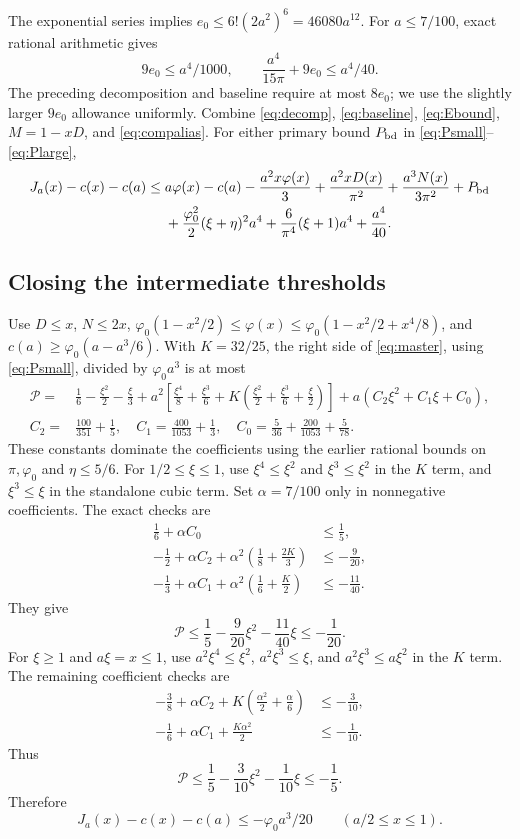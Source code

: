 \documentclass[11pt]{article}
\newcommand{\ph}{\varphi}
\newcommand{\phz}{\varphi_0}
\newcommand{\ep}{e_0}
\begin{document}
The exponential series implies
$\ep\le6!(2a^2)^6=46080a^{12}$.
For $a\le7/100$, exact rational arithmetic gives
\[
 9\ep\le a^4/1000,\qquad
 \frac{a^4}{15\pi}+9\ep\le a^4/40.
\]
The preceding decomposition and baseline require at most $8\ep$; we use
the slightly larger $9\ep$ allowance uniformly.
Combine \eqref{eq:decomp}, \eqref{eq:baseline}, \eqref{eq:Ebound},
$M=1-xD$, and \eqref{eq:compalias}. For either primary bound
$P_{\rm bd}$ in \eqref{eq:Psmall}--\eqref{eq:Plarge},
\begin{align}
 J_a(x)-c(x)-c(a)\le{}&a\ph(x)-c(a)-\frac{a^2x\ph(x)}3
   +\frac{a^2xD(x)}{\pi^2}+\frac{a^3N(x)}{3\pi^2}+P_{\rm bd}\notag\\
 &+\frac{\phz^2}2(\xi+\eta)^2a^4
   +\frac6{\pi^4}(\xi+1)a^4+\frac{a^4}{40}.\label{eq:master}
\end{align}

\subsection{Closing the intermediate thresholds}

Use $D\le x$, $N\le2x$,
$\phz(1-x^2/2)\le\ph(x)\le\phz(1-x^2/2+x^4/8)$,
and $c(a)\ge\phz(a-a^3/6)$. With $K=32/25$,
the right side of \eqref{eq:master}, using \eqref{eq:Psmall}, divided by
$\phz a^3$ is at most
\begin{align*}
 \mathcal P={}&\frac16-\frac{\xi^2}2-\frac\xi3
 +a^2\left[\frac{\xi^4}8+\frac{\xi^3}6
             +K\left(\frac{\xi^2}2+\frac{\xi^3}6+\frac\xi2\right)\right]
 +a(C_2\xi^2+C_1\xi+C_0),\\
 C_2={}&\frac{100}{351}+\frac15,\quad
 C_1=\frac{400}{1053}+\frac13,\quad
 C_0=\frac5{36}+\frac{200}{1053}+\frac5{78}.
\end{align*}
These constants dominate the coefficients using the earlier rational
bounds on $\pi,\phz$ and $\eta\le5/6$.
For $1/2\le\xi\le1$, use $\xi^4\le\xi^2$ and $\xi^3\le\xi^2$ in
the $K$ term, and $\xi^3\le\xi$ in the standalone cubic term. Set
$\alpha=7/100$ only in nonnegative coefficients. The exact checks are
\begin{align*}
 \frac16+\alpha C_0&\le\frac15,\\
 -\frac12+\alpha C_2+\alpha^2\left(\frac18+\frac{2K}3\right)
       &\le-\frac9{20},\\
 -\frac13+\alpha C_1+\alpha^2\left(\frac16+\frac K2\right)
       &\le-\frac{11}{40}.
\end{align*}
They give
\[
 \mathcal P\le\frac15-\frac9{20}\xi^2-\frac{11}{40}\xi\le-\frac1{20}.
\]
For $\xi\ge1$ and $a\xi=x\le1$, use
$a^2\xi^4\le\xi^2$, $a^2\xi^3\le\xi$, and
$a^2\xi^3\le a\xi^2$ in the $K$ term. The remaining coefficient checks are
\begin{align*}
 -\frac38+\alpha C_2+K\left(\frac{\alpha^2}2+\frac\alpha6\right)
       &\le-\frac3{10},\\
 -\frac16+\alpha C_1+\frac{K\alpha^2}2&\le-\frac1{10}.
\end{align*}
Thus
\[
 \mathcal P\le\frac15-\frac3{10}\xi^2-\frac1{10}\xi\le-\frac15.
\]
Therefore
\begin{equation}\label{eq:smallgap}
 J_a(x)-c(x)-c(a)\le-\phz a^3/20\qquad(a/2\le x\le1).
\end{equation}
\end{document}
